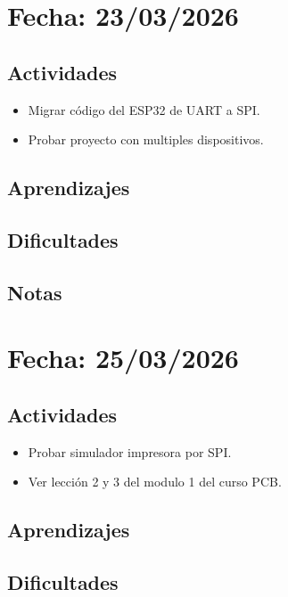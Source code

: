 \documentclass[12pt, a4paper]{article}
\begin{document}
    \section*{Fecha: 23/03/2026}

    \subsection*{Actividades}

    \begin{itemize}
        \item Migrar código del ESP32 de UART a SPI.
        \item Probar proyecto con multiples dispositivos.
    \end{itemize}

    \subsection*{Aprendizajes}

    \subsection*{Dificultades}

    \subsection*{Notas}

    \section*{Fecha: 25/03/2026}

    \subsection*{Actividades}

    \begin{itemize}
        \item Probar simulador impresora por SPI.
        \item Ver lección 2 y 3 del modulo 1 del curso PCB.
    \end{itemize}

    \subsection*{Aprendizajes}

    \subsection*{Dificultades}
\end{document}
